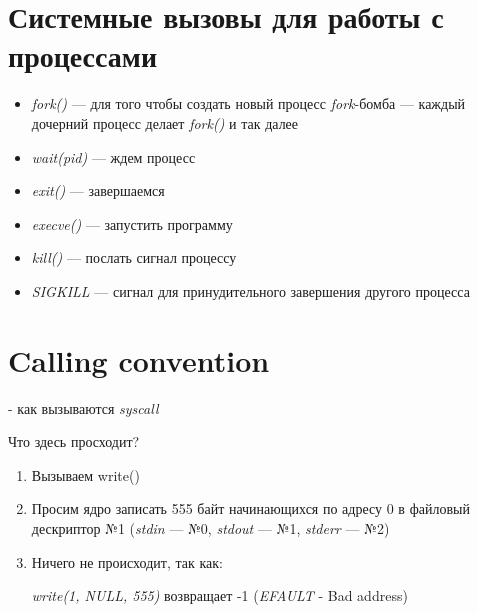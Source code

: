 \documentclass[../../lectures.tex]{subfiles}
\begin{document}
\section{Системные вызовы для работы с процессами}
\begin{itemize}
    \item \emph{fork()} --- для того чтобы создать новый процесс
    \emph{fork}-бомба --- каждый дочерний процесс делает \emph{fork()} и так далее
    \item \emph{wait(pid)} --- ждем процесс
    \item \emph{exit()} --- завершаемся
    \item \emph{execve()} --- запустить программу
    \item \emph{kill()} --- послать сигнал процессу
    \item \emph{SIGKILL} --- сигнал для принудительного завершения другого процесса 

\end{itemize}

\section{Calling convention}
 - как вызываются \emph{syscall}


Что здесь просходит?
\begin{enumerate}
    \item Вызываем write()
    \item Просим ядро записать 555 байт начинающихся по адресу 0 в файловый дескриптор №1 
          (\emph{stdin} --- №0, \emph{stdout} --- №1, \emph{stderr} --- №2)
    \item Ничего не происходит, так как:

          \emph{write(1, NULL, 555)} возвращает -1 (\emph{EFAULT} - Bad address)
\end{enumerate}
\end{document}

